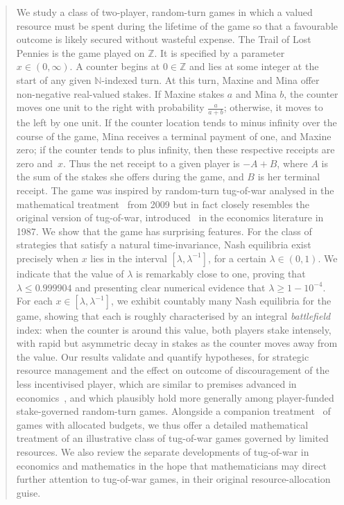 \documentclass[letterpaper,11pt,oneside,reqno]{amsbook}
\newcommand{\N}{\ensuremath{\mathbb{N}}}
\newcommand{\Z}{\ensuremath{\mathbb{Z}}}
\numberwithin{figure}{chapter}
\theoremstyle{definition}
\theoremstyle{definition}
\theoremstyle{definition}
\theoremstyle{definition}
\theoremstyle{definition}
\begin{document}
\begin{abstract} 
We study a class of
 two-player, random-turn games
in which a valued resource must be spent during the lifetime of the game so that a favourable outcome is likely secured without wasteful expense.
The Trail of Lost Pennies is the game played on $\Z$. 
It is specified by a parameter $x \in (0,\infty)$. A counter begins at $0 \in \Z$ and lies at some integer at the start of any given $\N$-indexed turn. At this turn, Maxine and Mina offer non-negative real-valued stakes. If Maxine stakes $a$ and Mina $b$, the counter moves one unit to the right with probability $\tfrac{a}{a+b}$; otherwise, it moves to the left by one unit. If the counter location tends to minus infinity over the course of the game, Mina receives a terminal payment of one, and Maxine zero; if the counter tends to plus infinity, then these respective receipts are zero and~$x$. Thus the net receipt to a given player is $-A+B$, where $A$ is the sum of the stakes she offers during the game, and $B$ is her terminal receipt. The game was inspired by  random-turn tug-of-war analysed in the mathematical treatment~\cite{PSSW09} from 2009
but in fact closely resembles the original version of tug-of-war, introduced~\cite{HarrisVickers87} in the economics literature in 1987.
 We show that the game has surprising features. For the class of strategies that satisfy a natural time-invariance, Nash equilibria exist precisely when $x$ lies in the interval $[\lambda,\lambda^{-1}]$, for a certain $\lambda \in (0,1)$. We indicate that the value of $\lambda$ is remarkably close to one, proving that $\lambda \leq 0.999904$ and presenting clear numerical evidence that $\lambda \geq 1 - 10^{-4}$. For each $x \in [\lambda,\lambda^{-1}]$, we exhibit countably many Nash equilibria for the game, showing that each is roughly characterised by an integral {\em battlefield} index: when the counter is around this value, both players stake intensely, with rapid but asymmetric decay in stakes as the counter moves away from the value. 
Our results validate and quantify hypotheses, for strategic resource management and the effect on outcome of discouragement of the less incentivised player, which are similar to premises advanced in economics~\cite{HarrisVickers87,Konrad2012}, and which
  plausibly hold more generally among player-funded stake-governed random-turn games.
Alongside a companion treatment~\cite{HP2022} of games with allocated budgets, we thus offer a detailed mathematical treatment of an illustrative class of tug-of-war games governed by limited resources. We also review the separate developments of tug-of-war in economics and mathematics in the hope that mathematicians may direct further attention to tug-of-war games, in their original resource-allocation guise.

\end{abstract}
\end{document}
